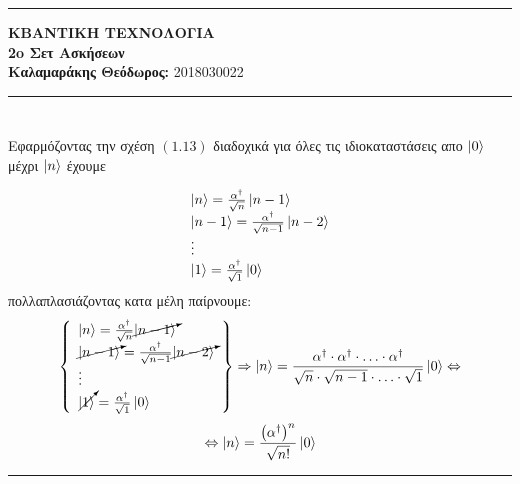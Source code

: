 \documentclass[12pt]{article}
\begin{document}
\greektext

\noindent\rule{\textwidth}{2pt}
\begin{center}
{\bf ΚΒΑΝΤΙΚΗ ΤΕΧΝΟΛΟΓΙΑ}\\ 
{\bf 2o Σετ Ασκήσεων }\\
{\bf Καλαμαράκης Θεόδωρος:} 2018030022\\
\end{center}
\rule{\textwidth}{.5pt}
\noindent

\begin{center}

\end{center}
 
 

\justifying




\section*{{}}
Εφαρμόζοντας την σχέση $(1.13)$ διαδοχικά για όλες τις ιδιοκαταστάσεις απο $\ket{0}$ μέχρι $\ket{n}$ έχουμε 

$$
\begin{array}{lr}
\ket{n}= \frac{\alpha^\dag}{\sqrt{n}}\ket{n-1}\\
\ket{n-1}= \frac{\alpha^\dag}{\sqrt{n-1}}\ket{n-2}\\
\vdots\\
\ket{1}= \frac{\alpha^\dag}{\sqrt{1}}\ket{0}\\
\end{array}
$$
πολλαπλασιάζοντας κατα μέλη παίρνουμε:
$$
\left\{
\begin{array}{lr}
\ket{n}= \frac{\alpha^\dag}{\sqrt{n}}\cancelto{}{ \ket{n-1}}\\
\cancelto{}{\ket{n-1}}= \frac{\alpha^\dag}{\sqrt{n-1}}\cancelto{}{\ket{n-2}}\\
\vdots\\
\cancelto{}{\ket{1}}= \frac{\alpha^\dag}{\sqrt{1}}\ket{0}\\
\end{array}
\right\} \Rightarrow \ket{n} = \frac{\alpha^\dag \cdot \alpha^\dag\cdot \hdots\cdot \alpha^\dag }{\sqrt{n}\cdot \sqrt{n-1}\cdot \hdots \cdot \sqrt{1}}\ket{0} \Leftrightarrow
$$
$$\Leftrightarrow \ket{n} = \frac{\left(\alpha^\dag\right)^n}{\sqrt{n!}}\ket{0}$$
\rule{\textwidth}{.5pt}
\end{document}
